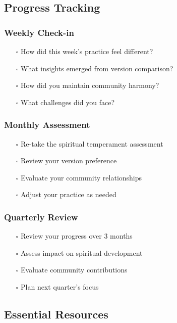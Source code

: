 \documentclass[11pt,twoside]{book}
\begin{document}
\subsection*{Progress Tracking}
\label{sec:orgprogress}

\subsubsection*{Weekly Check-in}
\label{sec:orgweekly}
\begin{itemize}
\item[$\square$] How did this week's practice feel different?
\item[$\square$] What insights emerged from version comparison?
\item[$\square$] How did you maintain community harmony?
\item[$\square$] What challenges did you face?
\end{itemize}

\subsubsection*{Monthly Assessment}
\label{sec:orgmonthlyassess}
\begin{itemize}
\item[$\square$] Re-take the spiritual temperament assessment
\item[$\square$] Review your version preference
\item[$\square$] Evaluate your community relationships
\item[$\square$] Adjust your practice as needed
\end{itemize}

\subsubsection*{Quarterly Review}
\label{sec:orgquarterly}
\begin{itemize}
\item[$\square$] Review your progress over 3 months
\item[$\square$] Assess impact on spiritual development
\item[$\square$] Evaluate community contributions
\item[$\square$] Plan next quarter's focus
\end{itemize}

\subsection*{Essential Resources}
\label{sec:orgresources}
\end{document}
